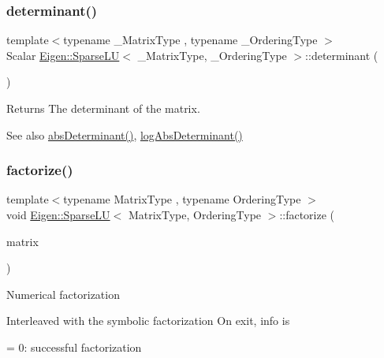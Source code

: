 \subsubsection{\texorpdfstring{determinant()}{determinant()}}
{\footnotesize\ttfamily template$<$typename \+\_\+\+Matrix\+Type , typename \+\_\+\+Ordering\+Type $>$ \\
Scalar \mbox{\hyperlink{class_eigen_1_1_sparse_l_u}{Eigen\+::\+Sparse\+LU}}$<$ \+\_\+\+Matrix\+Type, \+\_\+\+Ordering\+Type $>$\+::determinant (\begin{DoxyParamCaption}{ }\end{DoxyParamCaption})\hspace{0.3cm}{\ttfamily [inline]}}

\begin{DoxyReturn}{Returns}
The determinant of the matrix.
\end{DoxyReturn}
\begin{DoxySeeAlso}{See also}
\mbox{\hyperlink{class_eigen_1_1_sparse_l_u_a06fa89424239fb169d408f08252426d0}{abs\+Determinant()}}, \mbox{\hyperlink{class_eigen_1_1_sparse_l_u_a89e30a7df205596784a5a73f4768eaec}{log\+Abs\+Determinant()}} 
\end{DoxySeeAlso}
\mbox{\label{class_eigen_1_1_sparse_l_u_a39858b0e72f2659d596364e252b34cbc}} 
\subsubsection{\texorpdfstring{factorize()}{factorize()}}
{\footnotesize\ttfamily template$<$typename Matrix\+Type , typename Ordering\+Type $>$ \\
void \mbox{\hyperlink{class_eigen_1_1_sparse_l_u}{Eigen\+::\+Sparse\+LU}}$<$ Matrix\+Type, Ordering\+Type $>$\+::factorize (\begin{DoxyParamCaption}\item[{const Matrix\+Type \&}]{matrix }\end{DoxyParamCaption})}


\begin{DoxyItemize}
\item Numerical factorization
\item Interleaved with the symbolic factorization On exit, info is

= 0\+: successful factorization
\end{DoxyItemize}


